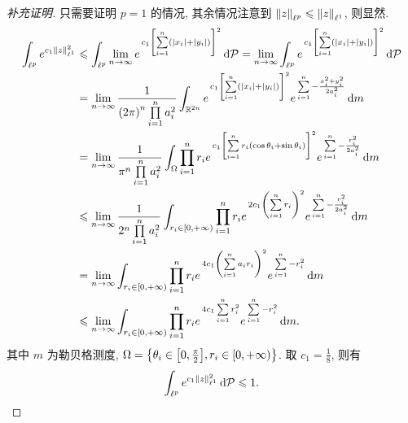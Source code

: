 \begin{proof}[补充证明]
只需要证明 $p=1$ 的情况, 其余情况注意到 $\left\Vert z\right\Vert_{\ell^p}\leqslant\left\Vert z\right\Vert_{\ell^1}$, 则显然.
\begingroup
\allowdisplaybreaks
\begin{align*}
\int_{\ell^p}e^{c_{1}\left\Vert z\right\Vert_{\ell^1}^{2}}&\leqslant \int_{\ell^p}\lim_{n\to\infty}e^{\,c_{1}\left[\sum\limits_{i=1}\limits^{n}\left(\left\vert x_{i}\right\vert+\left\vert y_{i}\right\vert\right)\right]^{2}}\,\mathrm{d}\mathcal{P}=\lim _{n\to\infty}\int_{\ell^p}e^{\,c_{1}\left[\sum\limits_{i=1}\limits^{n}\left(\left\vert x_{i}\right\vert+\left\vert y_{i}\right\vert\right)\right]^{2}}\,\mathrm{d}\mathcal{P}\\
&= \lim _{n\to\infty}\frac{1}{\left(2\pi\right)^{n}\prod\limits_{i=1}\limits^{n}a_{i}^{2}}\int_{\mathbb{R}^{2n}}e^{\,c_{1}\left[\sum\limits_{i=1}\limits^{n}\left(\left\vert x_{i}\right\vert+\left\vert y_{i}\right\vert\right)\right]^{2}}e^{\,\sum\limits_{i=1}\limits^{n}-\frac{x_{i}^{2}+y_{i}^{2}}{2a_{i}^{2}}}\,\mathrm{d} m\\
&= \lim _{n\to\infty}\frac{1}{\pi^{n}\prod\limits_{i=1}\limits^{n}a_{i}^{2}}\int_{\Omega}\prod_{i=1}^{n}r_{i}e^{\,c_{1}\left[\sum\limits_{i=1}\limits^{n}r_{i}\left(\cos\theta_{i}+\sin\theta_{i}\right)\right]^{2}}e^{\,\sum\limits_{i=1}\limits^{n}-\frac{r_{i}^{2}}{2a_{i}^{2}}}\,\mathrm{d} m\\
&\leqslant \lim _{n\to\infty}\frac{1}{2^{n}\prod\limits_{i=1}\limits^{n}a_{i}^{2}}\int_{r_{i}\in[0,+\infty)}\prod_{i=1}^{n}r_{i}e^{\,2c_{1}\left(\sum\limits_{i=1}\limits^{n}r_{i}\right)^2}e^{\,\sum\limits_{i=1}\limits^{n}-\frac{r_{i}^{2}}{2a_{i}^{2}}}\,\mathrm{d} m\\
&= \lim _{n\to\infty}\int_{r_{i}\in[0,+\infty)}\prod_{i=1}^{n}r_{i}e^{\,4c_{1}\left(\sum\limits_{i=1}\limits^{n}a_{i}r_{i}\right)^{2}}e^{\,\sum\limits_{i=1}\limits^{n}-r_{i}^{2}}\,\mathrm{d} m\\
&\leqslant \lim _{n\to\infty}\int_{r_{i}\in[0,+\infty)}\prod_{i=1}^{n}r_{i}e^{\,4c_{1}\sum\limits_{i=1}\limits^{n}r_{i}^{2}}e^{\,\sum\limits_{i=1}\limits^{n}-r_{i}^{2}}\,\mathrm{d} m.
\end{align*}
\endgroup
其中 $m$ 为勒贝格测度, $\Omega=\dk{\theta_{i}\in\zk{0,\frac{\pi}{2}},r_{i}\in[0,+\infty)}$. 取 $c_{1}=\frac{1}{8}$, 则有
\begin{equation*}
\int_{\ell^p}e^{c_{1}\left\Vert z\right\Vert_{\ell^1}^{2}}\,\mathrm{d}\mathcal{P}\leqslant 1.\qedhere
\end{equation*}
\end{proof}